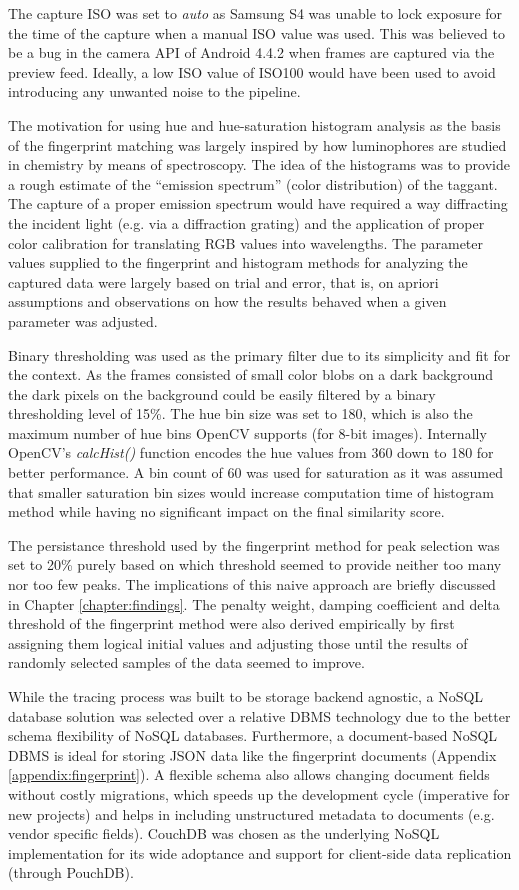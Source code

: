 \documentclass[thesis.tex]{subfiles}
\begin{document}
The capture ISO was set to \emph{auto} as Samsung S4 was unable to lock exposure for the time of the capture when a manual ISO value was used. This was believed to be a bug in the camera API of Android 4.4.2 when frames are captured via the preview feed. Ideally, a low ISO value of ISO100 would have been used to avoid introducing any unwanted noise to the pipeline.

The motivation for using hue and hue-saturation histogram analysis as the basis of the fingerprint matching was largely inspired by how luminophores are studied in chemistry by means of spectroscopy. The idea of the histograms was to provide a rough estimate of the ``emission spectrum'' (color distribution) of the taggant. The capture of a proper emission spectrum would have required a way diffracting the incident light (e.g. via a diffraction grating) and the application of proper color calibration for translating RGB values into wavelengths. The parameter values supplied to the fingerprint and histogram methods for analyzing the captured data were largely based on trial and error, that is, on apriori assumptions and observations on how the results behaved when a given parameter was adjusted.

Binary thresholding was used as the primary filter due to its simplicity and fit for the context. As the frames consisted of small color blobs on a dark background the dark pixels on the background could be easily filtered by a binary thresholding level of 15\%. The hue bin size was set to 180, which is also the maximum number of hue bins OpenCV supports (for 8-bit images). Internally OpenCV's \emph{calcHist()} function encodes the hue values from 360 down to 180 for better performance. A bin count of 60 was used for saturation as it was assumed that smaller saturation bin sizes would increase computation time of histogram method while having no significant impact on the final similarity score.

The persistance threshold used by the fingerprint method for peak selection was set to 20\% purely based on which threshold seemed to provide neither too many nor too few peaks. The implications of this naive approach are briefly discussed in Chapter \ref{chapter:findings}. The penalty weight, damping coefficient and delta threshold of the fingerprint method were also derived empirically by first assigning them logical initial values and adjusting those until the results of randomly selected samples of the data seemed to improve.

While the tracing process was built to be storage backend agnostic, a NoSQL database solution was selected over a relative DBMS technology due to the better schema flexibility of NoSQL databases. Furthermore, a document-based NoSQL DBMS is ideal for storing JSON data like the fingerprint documents (Appendix \ref{appendix:fingerprint}). A flexible schema also allows changing document fields without costly migrations, which speeds up the development cycle (imperative for new projects) and helps in including unstructured metadata to documents (e.g. vendor specific fields). CouchDB was chosen as the underlying NoSQL implementation for its wide adoptance and support for client-side data replication (through PouchDB).
\end{document}
